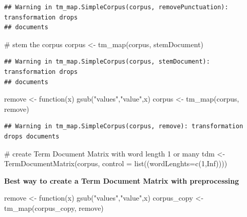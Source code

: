\documentclass[
]{article}
\newenvironment{Shaded}{}{}
\newcommand{\AttributeTok}[1]{#1}
\newcommand{\CommentTok}[1]{\textcolor[rgb]{0.30,0.53,0.42}{#1}}
\newcommand{\ConstantTok}[1]{\textcolor[rgb]{0.35,0.36,0.96}{#1}}
\newcommand{\ControlFlowTok}[1]{\textcolor[rgb]{0.00,0.00,1.00}{#1}}
\newcommand{\DecValTok}[1]{\textcolor[rgb]{0.00,0.00,0.80}{#1}}
\newcommand{\FunctionTok}[1]{#1}
\newcommand{\NormalTok}[1]{#1}
\newcommand{\OtherTok}[1]{\textcolor[rgb]{1.00,0.25,0.00}{#1}}
\newcommand{\StringTok}[1]{\textcolor[rgb]{0.01,0.42,0.03}{#1}}
\begin{document}
\begin{verbatim}
## Warning in tm_map.SimpleCorpus(corpus, removePunctuation): transformation drops
## documents
\end{verbatim}

\begin{Shaded}
\begin{Highlighting}[]
\CommentTok{\# stem the corpus}
\NormalTok{corpus }\OtherTok{\textless{}{-}} \FunctionTok{tm\_map}\NormalTok{(corpus, stemDocument)}
\end{Highlighting}
\end{Shaded}

\begin{verbatim}
## Warning in tm_map.SimpleCorpus(corpus, stemDocument): transformation drops
## documents
\end{verbatim}

\begin{Shaded}
\begin{Highlighting}[]
\NormalTok{remove }\OtherTok{\textless{}{-}} \ControlFlowTok{function}\NormalTok{(x) }\FunctionTok{gsub}\NormalTok{(}\StringTok{"values"}\NormalTok{,}\StringTok{"value"}\NormalTok{,x)}
\NormalTok{corpus }\OtherTok{\textless{}{-}}  \FunctionTok{tm\_map}\NormalTok{(corpus, remove)}
\end{Highlighting}
\end{Shaded}

\begin{verbatim}
## Warning in tm_map.SimpleCorpus(corpus, remove): transformation drops documents
\end{verbatim}

\begin{Shaded}
\begin{Highlighting}[]
\CommentTok{\# create Term Document Matrix with word length 1 or many}
\NormalTok{tdm }\OtherTok{\textless{}{-}} \FunctionTok{TermDocumentMatrix}\NormalTok{(corpus, }\AttributeTok{control =} \FunctionTok{list}\NormalTok{((}\AttributeTok{wordLenghts=}\FunctionTok{c}\NormalTok{(}\DecValTok{1}\NormalTok{,}\ConstantTok{Inf}\NormalTok{))))}
\end{Highlighting}
\end{Shaded}

\textbf{Best way to create a Term Document Matrix with preprocessing}

\begin{Shaded}
\begin{Highlighting}[]
\NormalTok{remove }\OtherTok{\textless{}{-}} \ControlFlowTok{function}\NormalTok{(x) }\FunctionTok{gsub}\NormalTok{(}\StringTok{"values"}\NormalTok{,}\StringTok{"value"}\NormalTok{,x)}
\NormalTok{corpus\_copy }\OtherTok{\textless{}{-}}  \FunctionTok{tm\_map}\NormalTok{(corpus\_copy, remove)}
\end{Highlighting}
\end{Shaded}
\end{document}
